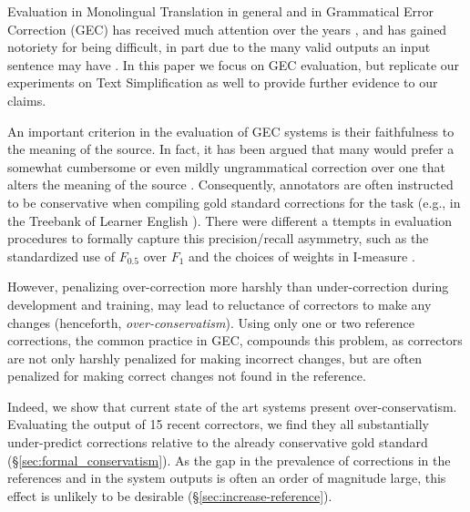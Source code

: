 \documentclass[letterpaper, 11pt]{article}
\newcommand{\oa}[1]{}
\begin{document}
Evaluation in Monolingual Translation in general and in Grammatical Error Correction (GEC) has received much attention over the
years \cite{tetreault2008native,madnani2011they,felice2015towards,bryant2015far,napoles2015ground}\oa{add refs from other tasks}, and
has gained notoriety for being difficult, in part due to the many valid outputs an input sentence may have \cite{chodorow2012problems}.
In this paper we focus on GEC evaluation, but replicate our experiments on Text Simplification as well to provide further evidence to our claims.


An important criterion in the evaluation of GEC systems is their faithfulness to the meaning of the source. 
In fact, it has been argued that many would prefer a somewhat cumbersome or even mildly ungrammatical 
correction over one that alters the meaning of the source \cite{brockett2006correcting}.
Consequently, annotators are often instructed to be conservative when compiling gold standard corrections for the task
(e.g., in the Treebank of Learner English \cite{nicholls2003cambridge}).
There were different a ttempts in evaluation procedures to formally capture this precision/recall asymmetry,
such as the standardized use of $F_{0.5}$ over $F_{1}$ \cite{dahlmeier2012better} and the 
choices of weights in I-measure \cite{felice2015towards}.

However, penalizing over-correction more harshly than under-correction during development and training, 
may lead to reluctance of correctors to make any changes (henceforth, {\it over-conservatism}).
Using only one or two reference corrections, the common practice in GEC, compounds this problem, 
as correctors are not only harshly penalized for making incorrect changes, but are often penalized
for making correct changes not found in the reference.

Indeed, we show that current state of the art systems present over-conservatism.
Evaluating the output of 15 recent correctors, we find they all
substantially under-predict corrections relative to the already conservative gold standard
(\S\ref{sec:formal_conservatism}).
As the gap in the prevalence of corrections in the references and in the system outputs 
is often an order of magnitude large, this effect is unlikely to be desirable (\S\ref{sec:increase-reference}).
\end{document}
